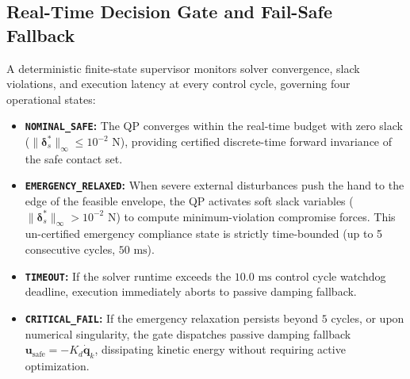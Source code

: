 \subsection{Real-Time Decision Gate and Fail-Safe Fallback}
A deterministic finite-state supervisor monitors solver convergence, slack violations, and execution latency at every control cycle, governing four operational states:
\begin{itemize}
    \item \textbf{\texttt{NOMINAL\_SAFE}:} The QP converges within the real-time budget with zero slack ($\|\boldsymbol{\delta}_s^*\|_\infty \le 10^{-2}\text{ N}$), providing certified discrete-time forward invariance of the safe contact set.
    \item \textbf{\texttt{EMERGENCY\_RELAXED}:} When severe external disturbances push the hand to the edge of the feasible envelope, the QP activates soft slack variables ($\|\boldsymbol{\delta}_s^*\|_\infty > 10^{-2}\text{ N}$) to compute minimum-violation compromise forces. This un-certified emergency compliance state is strictly time-bounded (up to 5 consecutive cycles, $50\text{ ms}$).
    \item \textbf{\texttt{TIMEOUT}:} If the solver runtime exceeds the $10.0\text{ ms}$ control cycle watchdog deadline, execution immediately aborts to passive damping fallback.
    \item \textbf{\texttt{CRITICAL\_FAIL}:} If the emergency relaxation persists beyond $5$ cycles, or upon numerical singularity, the gate dispatches passive damping fallback $\mathbf{u}_{\text{safe}} = -K_d \dot{\mathbf{q}}_k$, dissipating kinetic energy without requiring active optimization.
\end{itemize}

